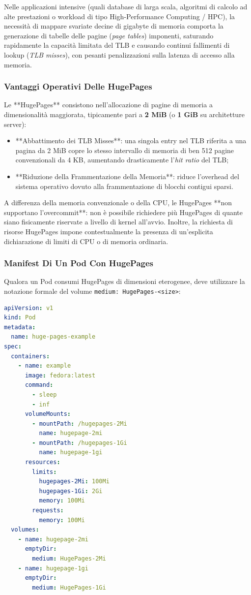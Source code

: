 \documentclass[11pt, a4paper]{article}
\begin{document}
Nelle applicazioni intensive (quali database di larga scala, algoritmi di calcolo ad alte prestazioni o workload di tipo High-Performance Computing / HPC), la necessità di mappare svariate decine di gigabyte di memoria comporta la generazione di tabelle delle pagine (\emph{page tables}) imponenti, saturando rapidamente la capacità limitata del TLB e causando continui fallimenti di lookup (\emph{TLB misses}), con pesanti penalizzazioni sulla latenza di accesso alla memoria.

\subsubsection{Vantaggi Operativi Delle HugePages}
Le **HugePages** consistono nell'allocazione di pagine di memoria a dimensionalità maggiorata, tipicamente pari a \textbf{2 MiB} (o \textbf{1 GiB} su architetture server):
\begin{itemize}[noitemsep]
    \item **Abbattimento dei TLB Misses**: una singola entry nel TLB riferita a una pagina da 2 MiB copre lo stesso intervallo di memoria di ben 512 pagine convenzionali da 4 KB, aumentando drasticamente l'\emph{hit ratio} del TLB;
    \item **Riduzione della Frammentazione della Memoria**: riduce l'overhead del sistema operativo dovuto alla frammentazione di blocchi contigui sparsi.
\end{itemize}

A differenza della memoria convenzionale o della CPU, le HugePages **non supportano l'overcommit**: non è possibile richiedere più HugePages di quante siano fisicamente riservate a livello di kernel all'avvio. Inoltre, la richiesta di risorse HugePages impone contestualmente la presenza di un'esplicita dichiarazione di limiti di CPU o di memoria ordinaria.

\subsubsection{Manifest Di Un Pod Con HugePages}
Qualora un Pod consumi HugePages di dimensioni eterogenee, deve utilizzare la notazione formale del volume \texttt{medium: HugePages-<size>}:

\begin{lstlisting}[language=yaml]
apiVersion: v1
kind: Pod
metadata:
  name: huge-pages-example
spec:
  containers:
    - name: example
      image: fedora:latest
      command:
        - sleep
        - inf
      volumeMounts:
        - mountPath: /hugepages-2Mi
          name: hugepage-2mi
        - mountPath: /hugepages-1Gi
          name: hugepage-1gi
      resources:
        limits:
          hugepages-2Mi: 100Mi
          hugepages-1Gi: 2Gi
          memory: 100Mi
        requests:
          memory: 100Mi
  volumes:
    - name: hugepage-2mi
      emptyDir:
        medium: HugePages-2Mi
    - name: hugepage-1gi
      emptyDir:
        medium: HugePages-1Gi
\end{lstlisting}
\end{document}
